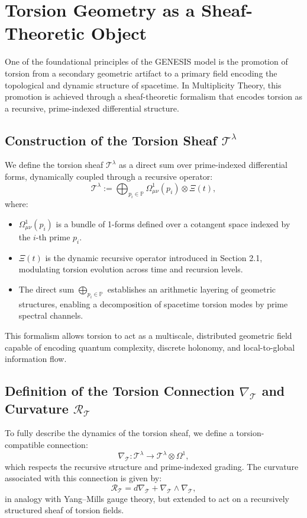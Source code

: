 \documentclass{article}
\theoremstyle{plain}
\begin{document}
\section{Torsion Geometry as a Sheaf-Theoretic Object}

One of the foundational principles of the GENESIS model is the promotion of torsion from a secondary geometric artifact to a primary field encoding the topological and dynamic structure of spacetime. In Multiplicity Theory, this promotion is achieved through a sheaf-theoretic formalism that encodes torsion as a recursive, prime-indexed differential structure.

\subsection{Construction of the Torsion Sheaf \texorpdfstring{$\mathcal{T}^\lambda$}{Tλ}}

We define the torsion sheaf $\mathcal{T}^\lambda$ as a direct sum over prime-indexed differential forms, dynamically coupled through a recursive operator:
\[
\mathcal{T}^\lambda := \bigoplus_{p_i \in \mathbb{P}} \Omega^1_{\mu\nu}(p_i) \otimes \Xi(t),
\]
where:
\begin{itemize}
    \item $\Omega^1_{\mu\nu}(p_i)$ is a bundle of 1-forms defined over a cotangent space indexed by the $i$-th prime $p_i$.
    \item $\Xi(t)$ is the dynamic recursive operator introduced in Section 2.1, modulating torsion evolution across time and recursion levels.
    \item The direct sum $\bigoplus_{p_i \in \mathbb{P}}$ establishes an arithmetic layering of geometric structures, enabling a decomposition of spacetime torsion modes by prime spectral channels.
\end{itemize}

This formalism allows torsion to act as a multiscale, distributed geometric field capable of encoding quantum complexity, discrete holonomy, and local-to-global information flow.

\subsection{Definition of the Torsion Connection \texorpdfstring{$\nabla_{\mathcal{T}}$}{∇T} and Curvature \texorpdfstring{$\mathcal{R}_{\mathcal{T}}$}{RT}}

To fully describe the dynamics of the torsion sheaf, we define a torsion-compatible connection:
\[
\nabla_{\mathcal{T}}: \mathcal{T}^\lambda \rightarrow \mathcal{T}^\lambda \otimes \Omega^1,
\]
which respects the recursive structure and prime-indexed grading. The curvature associated with this connection is given by:
\[
\mathcal{R}_{\mathcal{T}} = d\nabla_{\mathcal{T}} + \nabla_{\mathcal{T}} \wedge \nabla_{\mathcal{T}},
\]
in analogy with Yang–Mills gauge theory, but extended to act on a recursively structured sheaf of torsion fields.
\end{document}
